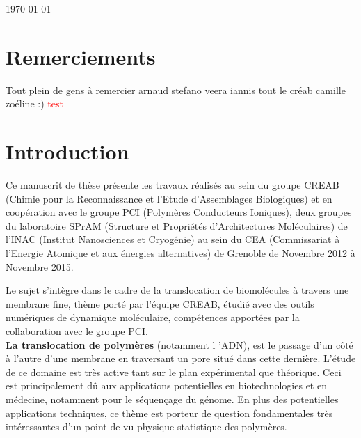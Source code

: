\documentclass[a4paper,11pt]{article}
\begin{document}
\begin{flushright}
\today
\end{flushright}

\vfill
\hfill 




\setlength{\parindent}{10pt}

\newpage

\section*{Remerciements}

Tout plein de gens à remercier
arnaud stefano veera iannis tout le créab camille zoéline :)
\textcolor{red}{test}

\newpage

\section*{Introduction}

Ce manuscrit de thèse présente les travaux réalisés au sein du groupe CREAB (Chimie pour la Reconnaissance et l’Etude d’Assemblages Biologiques) et en coopération avec le groupe PCI (Polymères Conducteurs Ioniques), deux groupes du laboratoire SPrAM (Structure et Propriétés d'Architectures Moléculaires) de l'INAC (Institut Nanosciences et Cryogénie) au sein du CEA (Commissariat à l'Energie Atomique et aux énergies alternatives) de Grenoble de Novembre 2012 à Novembre 2015.

Le sujet s'intègre dans le cadre de la translocation de biomolécules à travers une membrane fine, thème porté par l'équipe CREAB, étudié avec des outils numériques de dynamique moléculaire, compétences apportées par la collaboration avec le groupe PCI. \\

\textbf{La translocation de polymères} (notamment l 'ADN), est le passage d'un c\^{o}té à l'autre d'une membrane en traversant un pore situé dans cette dernière. L'étude de ce domaine est très active tant sur le plan expérimental que théorique. Ceci est principalement d\^{u} aux applications potentielles en biotechnologies et en médecine, notamment pour le séquençage du génome. En plus des potentielles applications techniques, ce thème est porteur de question fondamentales très intéressantes d'un point de vu physique statistique des polymères.\\
\end{document}
